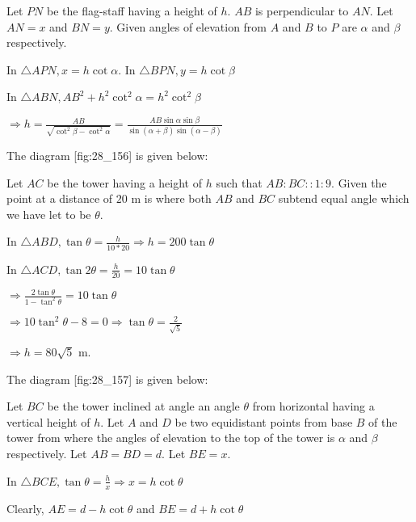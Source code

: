   \startplacefigure[reference=fig:28_155]
    \externalfigure[28_155.pdf]
  \stopplacefigure

  Let $PN$ be the flag-staff having a height of $h$. $AB$ is perpendicular to
  $AN$. Let $AN = x$ and $BN = y$. Given angles of elevation from $A$ and
  $B$ to $P$ are $\alpha$ and $\beta$ respectively.

  In $\triangle APN, x = h\cot\alpha$. In $\triangle BPN, y = h\cot\beta$

  In $\triangle ABN, AB^2 + h^2\cot^2\alpha = h^2\cot^2\beta$

  $\Rightarrow h = \frac{AB}{\sqrt{\cot^2\beta - \cot^2\alpha}} =
  \frac{AB\sin\alpha\sin\beta}{\sin(\alpha + \beta)\sin(\alpha - \beta)}$

\item The diagram [fig:28_156] is given below:

  \startplacefigure[reference=fig:28_156]
    \externalfigure[28_156.pdf]
  \stopplacefigure

  Let $AC$ be the tower having a height of $h$ such that $AB:BC::1:9$. Given the point
  at a distance of $20$ m is where both $AB$ and $BC$ subtend equal angle which we have
  let to be $\theta$.

  In $\triangle ABD, \tan\theta = \frac{h}{10*20} \Rightarrow h = 200\tan\theta$

  In $\triangle ACD, \tan2\theta = \frac{h}{20} = 10\tan\theta$

  $\Rightarrow \frac{2\tan\theta}{1 - \tan^2\theta} = 10\tan\theta$

  $\Rightarrow 10\tan^2\theta -8 = 0 \Rightarrow \tan\theta = \frac{2}{\sqrt{5}}$

  $\Rightarrow h = 80\sqrt{5}$ m.

\item The diagram [fig:28_157] is given below:

  \startplacefigure[reference=fig:28_157]
    \externalfigure[28_157.pdf]
  \stopplacefigure

  Let $BC$ be the tower inclined at angle an angle $\theta$ from horizontal having a vertical
  height of $h$. Let $A$ and $D$ be two equidistant points from base $B$ of the
  tower from where the angles of elevation to the top of the tower is $\alpha$ and $\beta$
  respectively. Let $AB = BD = d$. Let $BE = x$.

  In $\triangle BCE, \tan\theta = \frac{h}{x} \Rightarrow x = h\cot\theta$

  Clearly, $AE = d - h\cot\theta$ and $BE = d + h\cot\theta$

